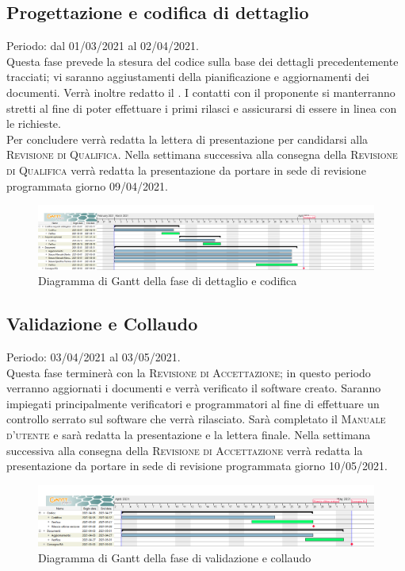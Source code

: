 \documentclass[../piano_di_progetto.tex]{subfiles}
\begin{document}
\subsection{Progettazione e codifica di dettaglio}%
\label{sub:prog_dett}
Periodo: dal 01/03/2021 al 02/04/2021.\\
Questa fase prevede la stesura del codice sulla base dei dettagli precedentemente tracciati; vi saranno aggiustamenti della pianificazione e aggiornamenti dei documenti. Verrà inoltre redatto il \textsc{}. I contatti con il proponente si manterranno stretti al fine di poter effettuare i primi rilasci e assicurarsi di essere in linea con le richieste.\\
Per concludere verrà redatta la lettera di presentazione per candidarsi alla \textsc{Revisione di Qualifica}. Nella settimana successiva alla consegna della \textsc{Revisione di Qualifica} verrà redatta la presentazione da portare in sede di revisione programmata giorno 09/04/2021. 

\begin{figure}[H]
\centering
\includegraphics[width=18cm]{src/img/gantt/03_RQ.png}
\caption{Diagramma di Gantt della fase di dettaglio e codifica}
\end{figure}

\subsection{Validazione e Collaudo}%
\label{sub:valid_coll}
Periodo: 03/04/2021 al 03/05/2021.\\
Questa fase terminerà con la \textsc{Revisione di Accettazione}; in questo periodo verranno aggiornati i documenti e verrà verificato il software creato. Saranno impiegati principalmente verificatori e programmatori al fine di effettuare un controllo serrato sul software che verrà rilasciato. Sarà completato il \textsc{Manuale d'utente} e sarà redatta la presentazione e la lettera finale. Nella settimana successiva alla consegna della \textsc{Revisione di Accettazione} verrà redatta la presentazione da portare in sede di revisione programmata giorno 10/05/2021.

\begin{figure}[H]
\centering
\includegraphics[width=18cm]{src/img/gantt/04_RA.png}
\caption{Diagramma di Gantt della fase di validazione e collaudo}
\end{figure}
\end{document}

